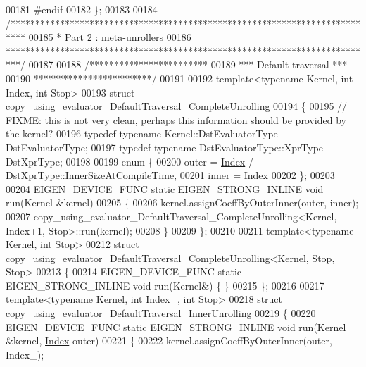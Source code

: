 \begin{DoxyCode}
00181 \textcolor{preprocessor}{#endif}
00182 \};
00183 
00184 \textcolor{comment}{/***************************************************************************}
00185 \textcolor{comment}{* Part 2 : meta-unrollers}
00186 \textcolor{comment}{***************************************************************************/}
00187 
00188 \textcolor{comment}{/************************}
00189 \textcolor{comment}{*** Default traversal ***}
00190 \textcolor{comment}{************************/}
00191 
00192 \textcolor{keyword}{template}<\textcolor{keyword}{typename} Kernel, \textcolor{keywordtype}{int} Index, \textcolor{keywordtype}{int} Stop>
00193 \textcolor{keyword}{struct }copy\_using\_evaluator\_DefaultTraversal\_CompleteUnrolling
00194 \{
00195   \textcolor{comment}{// FIXME: this is not very clean, perhaps this information should be provided by the kernel?}
00196   \textcolor{keyword}{typedef} \textcolor{keyword}{typename} Kernel::DstEvaluatorType DstEvaluatorType;
00197   \textcolor{keyword}{typedef} \textcolor{keyword}{typename} DstEvaluatorType::XprType DstXprType;
00198   
00199   \textcolor{keyword}{enum} \{
00200     outer = \hyperlink{namespace_eigen_a62e77e0933482dafde8fe197d9a2cfde}{Index} / DstXprType::InnerSizeAtCompileTime,
00201     inner = \hyperlink{namespace_eigen_a62e77e0933482dafde8fe197d9a2cfde}{Index} %
00202   \};
00203 
00204   EIGEN\_DEVICE\_FUNC \textcolor{keyword}{static} EIGEN\_STRONG\_INLINE \textcolor{keywordtype}{void} run(Kernel &kernel)
00205   \{
00206     kernel.assignCoeffByOuterInner(outer, inner);
00207     copy\_using\_evaluator\_DefaultTraversal\_CompleteUnrolling<Kernel, Index+1, Stop>::run(kernel);
00208   \}
00209 \};
00210 
00211 \textcolor{keyword}{template}<\textcolor{keyword}{typename} Kernel, \textcolor{keywordtype}{int} Stop>
00212 \textcolor{keyword}{struct }copy\_using\_evaluator\_DefaultTraversal\_CompleteUnrolling<Kernel, Stop, Stop>
00213 \{
00214   EIGEN\_DEVICE\_FUNC \textcolor{keyword}{static} EIGEN\_STRONG\_INLINE \textcolor{keywordtype}{void} run(Kernel&) \{ \}
00215 \};
00216 
00217 \textcolor{keyword}{template}<\textcolor{keyword}{typename} Kernel, \textcolor{keywordtype}{int} Index\_, \textcolor{keywordtype}{int} Stop>
00218 \textcolor{keyword}{struct }copy\_using\_evaluator\_DefaultTraversal\_InnerUnrolling
00219 \{
00220   EIGEN\_DEVICE\_FUNC \textcolor{keyword}{static} EIGEN\_STRONG\_INLINE \textcolor{keywordtype}{void} run(Kernel &kernel, \hyperlink{namespace_eigen_a62e77e0933482dafde8fe197d9a2cfde}{Index} outer)
00221   \{
00222     kernel.assignCoeffByOuterInner(outer, Index\_);

\end{DoxyCode}

